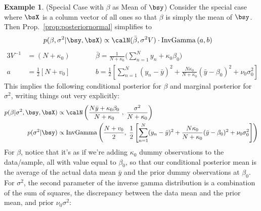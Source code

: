 \documentclass[12pt]{article}
\theoremstyle{plain}
\theoremstyle{definition}
\newtheorem{ex}[thm]{Example}
\theoremstyle{remark}
\newcommand{\sumnN}{\sum^N_{n=1}}
\begin{document}
\clearpage
\begin{ex}(Special Case with $\beta$ as Mean of $\bsy$)
Consider the special case where $\bsX$ is a column vector of all ones so
that $\beta$ is simply the mean of $\bsy$.
Then Prop.~\ref{prop:posteriornormal} simplifies to
\begin{align}
  p(\beta, \sigma^2 | \bsy,\bsX)
  &\propto
  \calN(\bar{\beta},\sigma^2V)
  \cdot
  \operatorname{InvGamma}\left(a,b\right)
\end{align}
\begin{alignat*}{3}
  V^{-1}&=(N+\kappa_0)
  \qquad
  &&\bar{\beta}
  = \frac{1}{N+\kappa_0}\bigg(\sumnN y_n + \kappa_0\beta_0\bigg)
  \\
  a &= \frac{1}{2}[N+v_0]
  \qquad&&b
  =
  \frac{1}{2}
  \left[
    \sumnN (y_n-\bar{y})^2
    + \frac{N\kappa_0}{N+\kappa_0}
      (\bar{y}-\beta_0)^2
    + \nu_0\sigma^2_0
  \right]
\end{alignat*}
This implies the following conditional posterior for $\beta$ and
marginal posterior for $\sigma^2$, writing things out very explicitly:
\begin{align*}
  p(\beta | \sigma^2,\bsy,\bsX)
  &\propto
  \calN\left(
    \frac{N\bar{y} + \kappa_0\beta_0}{N + \kappa_0}
  \; , \; \frac{\sigma^2}{N+\kappa_0}
  \right)
  \\
  p(\sigma^2|\bsy)
  &\propto
  \operatorname{InvGamma}\left(
    \frac{N+v_0}{2},\;
    \frac{1}{2}
    \left[
      \sumnN (y_n-\bar{y})^2
      + \frac{N\kappa_0}{N+\kappa_0}
        (\bar{y}-\beta_0)^2
      + \nu_0\sigma^2_0
    \right]
  \right)
\end{align*}
For $\beta$, notice that it's as if we're adding $\kappa_0$ dummy
observations to the data/sample, all with value equal to $\beta_0$, so
that our conditional posterior mean is the average of the actual data
mean $\bar{y}$ and the prior dummy observations at $\beta_0$.  For
$\sigma^2$, the second parameter of the inverse gamma distribution is a
combination of the sum of squares, the discrepancy between the data mean
and the prior mean, and prior $\nu_0\sigma^2$:



\end{ex}
\end{document}
